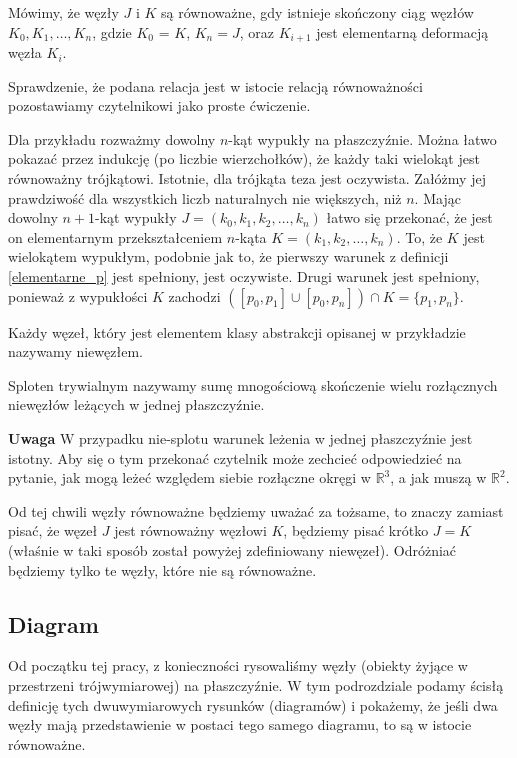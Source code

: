 \begin{definicja}
 Mówimy, że węzły $J$ i $K$ są równoważne, gdy istnieje skończony ciąg węzłów $K_0, K_1, \ldots, K_n$, gdzie $K_0$ = $K$, $K_n = J$, oraz $K_{i+1}$ jest elementarną
 deformacją węzła $K_i$. 
\end{definicja}

Sprawdzenie, że podana relacja jest w istocie relacją równoważności pozostawiamy czytelnikowi jako proste ćwiczenie.

Dla przykładu rozważmy dowolny $n$-kąt wypukły na płaszczyźnie. Można łatwo pokazać przez indukcję (po liczbie wierzchołków), że każdy taki wielokąt jest równoważny trójkątowi. 
Istotnie, dla trójkąta
teza jest oczywista. Załóżmy jej prawdziwość dla wszystkich liczb naturalnych nie większych, niż $n$. Mając dowolny $n+1$-kąt wypukły $J = (k_0, k_1, k_2, \ldots, k_n)$ łatwo się przekonać,
że jest on elementarnym przekształceniem $n$-kąta $ K = (k_1, k_2, \ldots, k_n)$. To, że $K$ jest wielokątem wypukłym, podobnie jak to, że pierwszy warunek z definicji \ref{elementarne_p} jest spełniony, jest oczywiste.
Drugi warunek jest spełniony, ponieważ z wypukłości $K$ zachodzi $\left([p_0,p_1]\cup [p_0, p_n]\right) \cap K = \lbrace p_1, p_n\rbrace$.

\begin{definicja}
 Każdy węzeł, który jest elementem klasy abstrakcji opisanej w przykładzie nazywamy niewęzłem.
\end{definicja}
\begin{definicja}
 Sploten trywialnym nazywamy sumę mnogościową skończenie wielu rozłącznych niewęzłów leżących w jednej płaszczyźnie.
\end{definicja}

\textbf{Uwaga} W przypadku nie-splotu warunek leżenia w jednej płaszczyźnie jest istotny. Aby się o tym przekonać czytelnik może zechcieć odpowiedzieć na pytanie, 
jak mogą leżeć względem siebie rozłączne okręgi w $\mathbb{R}^3$, a jak muszą w $\mathbb{R}^2$.

Od tej chwili węzły równoważne będziemy uważać za tożsame, to znaczy zamiast pisać, że węzeł $J$ jest równoważny węzłowi $K$, będziemy pisać krótko $J=K$ (właśnie w taki sposób
został powyżej zdefiniowany niewęzeł).
Odróżniać będziemy tylko te węzły, które nie są równoważne. 

\subsection{Diagram}
Od początku tej pracy, z konieczności rysowaliśmy węzły (obiekty żyjące w przestrzeni trójwymiarowej) na płaszczyźnie. 
W tym podrozdziale podamy ścisłą definicję tych dwuwymiarowych rysunków (diagramów) i pokażemy, że jeśli dwa węzły mają przedstawienie w postaci tego samego diagramu, 
to są w istocie równoważne.

